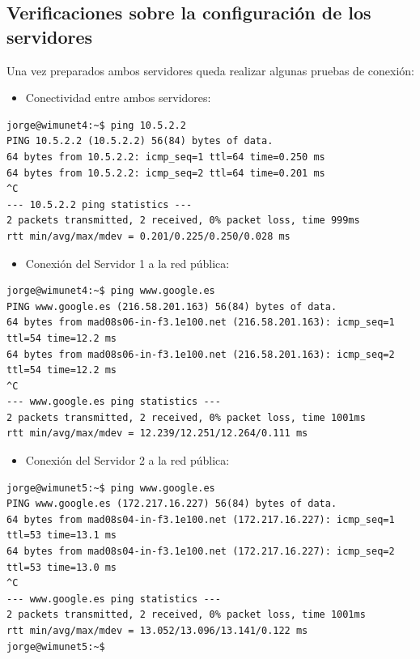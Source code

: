 \subsection{Verificaciones sobre la configuración de los servidores}
Una vez preparados ambos servidores queda realizar algunas pruebas de conexión:

\begin{itemize}
\item Conectividad entre ambos servidores:
\end{itemize}
\begin{lstlisting}[style=Consola]
jorge@wimunet4:~$ ping 10.5.2.2
PING 10.5.2.2 (10.5.2.2) 56(84) bytes of data.
64 bytes from 10.5.2.2: icmp_seq=1 ttl=64 time=0.250 ms
64 bytes from 10.5.2.2: icmp_seq=2 ttl=64 time=0.201 ms
^C
--- 10.5.2.2 ping statistics ---
2 packets transmitted, 2 received, 0% packet loss, time 999ms
rtt min/avg/max/mdev = 0.201/0.225/0.250/0.028 ms

\end{lstlisting}

\begin{itemize}
\item Conexión del Servidor 1 a la red pública:
\end{itemize}
\begin{lstlisting}[style=Consola]
jorge@wimunet4:~$ ping www.google.es
PING www.google.es (216.58.201.163) 56(84) bytes of data.
64 bytes from mad08s06-in-f3.1e100.net (216.58.201.163): icmp_seq=1 ttl=54 time=12.2 ms
64 bytes from mad08s06-in-f3.1e100.net (216.58.201.163): icmp_seq=2 ttl=54 time=12.2 ms
^C
--- www.google.es ping statistics ---
2 packets transmitted, 2 received, 0% packet loss, time 1001ms
rtt min/avg/max/mdev = 12.239/12.251/12.264/0.111 ms

\end{lstlisting}

\begin{itemize}
\item Conexión del Servidor 2 a la red pública:
\end{itemize}
\begin{lstlisting}[style=Consola]
jorge@wimunet5:~$ ping www.google.es
PING www.google.es (172.217.16.227) 56(84) bytes of data.
64 bytes from mad08s04-in-f3.1e100.net (172.217.16.227): icmp_seq=1 ttl=53 time=13.1 ms
64 bytes from mad08s04-in-f3.1e100.net (172.217.16.227): icmp_seq=2 ttl=53 time=13.0 ms
^C
--- www.google.es ping statistics ---
2 packets transmitted, 2 received, 0% packet loss, time 1001ms
rtt min/avg/max/mdev = 13.052/13.096/13.141/0.122 ms
jorge@wimunet5:~$
\end{lstlisting}

